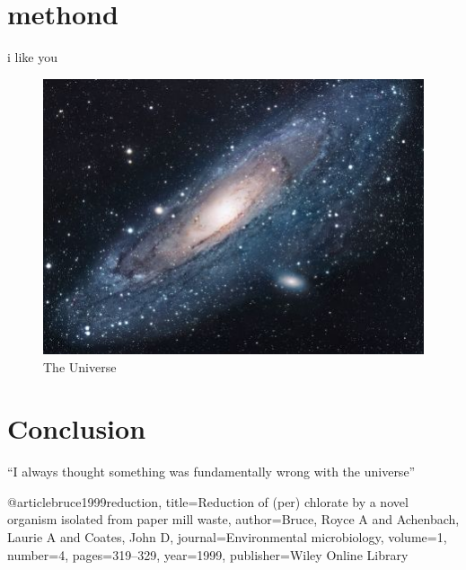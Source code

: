 \documentclass{article}
\begin{document}
\section{methond}
i like you 
\textbf{}
\begin{figure}[h!]
\centering
\includegraphics[scale=1.7]{universe}
\caption{The Universe}
\label{fig:universe}
\end{figure}

\section{Conclusion}
``I always thought something was fundamentally wrong with the universe'' \citep{adams1995hitchhiker}


@article{bruce1999reduction,
  title={Reduction of (per) chlorate by a novel organism isolated from paper mill waste},
  author={Bruce, Royce A and Achenbach, Laurie A and Coates, John D},
  journal={Environmental microbiology},
  volume={1},
  number={4},
  pages={319--329},
  year={1999},
  publisher={Wiley Online Library}
}

\end{document}
